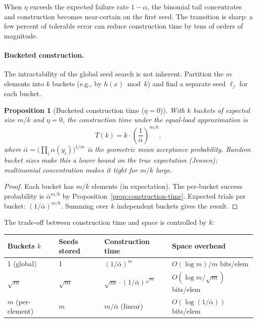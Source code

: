 \documentclass[11pt]{article}
\theoremstyle{definition}
\theoremstyle{plain}
\newtheorem{proposition}[theorem]{Proposition}
\theoremstyle{remark}
\begin{document}
When $\eta$ exceeds the expected failure rate $1 - \alpha$, the binomial
tail concentrates and construction becomes near-certain on the first seed.
The transition is sharp: a few percent of tolerable error can reduce
construction time by tens of orders of magnitude.

\paragraph{Bucketed construction.}
The intractability of the global seed search is not inherent.  Partition
the $m$ elements into $k$ buckets (e.g., by
$h(x) \bmod k$) and find a separate seed $\ell_j$ for each bucket.

\begin{proposition}[Bucketed construction time ($\eta = 0$)]
\label{prop:bucketed}
With $k$ buckets of expected size $m/k$ and $\eta = 0$, the construction
time under the equal-load approximation is
\begin{equation}
T(k) = k \cdot \left(\frac{1}{\bar{\alpha}}\right)^{m/k},
\end{equation}
where $\bar{\alpha} = \bigl(\prod_i \alpha(y_i)\bigr)^{1/m}$ is the
geometric mean acceptance probability.  Random bucket sizes make this a
lower bound on the true expectation (Jensen); multinomial concentration
makes it tight for $m/k$ large.
\end{proposition}

\begin{proof}
Each bucket has $m/k$ elements (in expectation).  The per-bucket success
probability is $\bar{\alpha}^{m/k}$ by
Proposition~\ref{prop:construction-time}.  Expected trials per bucket:
$(1/\bar{\alpha})^{m/k}$.  Summing over $k$ independent buckets gives the
result.
\end{proof}

The trade-off between construction time and space is controlled by $k$:

\begin{center}
\begin{tabular}{@{}llll@{}}
\toprule
Buckets $k$ & Seeds stored & Construction time & Space overhead \\
\midrule
1 (global) & 1 & $(1/\bar{\alpha})^m$ & $O(\log m) / m$ bits/elem \\
$\sqrt{m}$ & $\sqrt{m}$ & $\sqrt{m} \cdot (1/\bar{\alpha})^{\sqrt{m}}$
    & $O(\log m / \sqrt{m})$ bits/elem \\
$m$ (per-element) & $m$ & $m / \bar{\alpha}$ (linear)
    & $O(\log(1/\bar{\alpha}))$ bits/elem \\
\bottomrule
\end{tabular}
\end{center}
\end{document}
